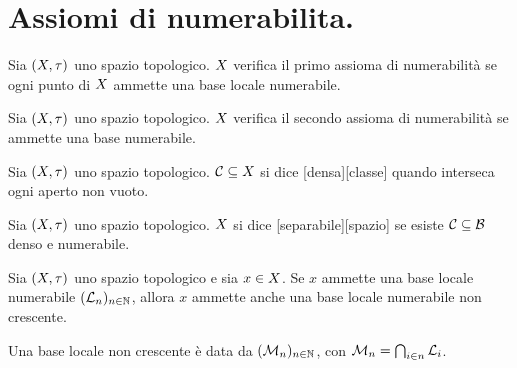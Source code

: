 \section{Assiomi di numerabilita.}\label{AssiomiDiNumerabilita}
\begin{Axiom}
	Sia $(X,\tau)$ uno spazio topologico.
	$X$ verifica il primo assioma di numerabilit\`a
	se ogni punto di $X$ ammette una base locale
	numerabile.
\end{Axiom}
\begin{Axiom}
	Sia $(X,\tau)$ uno spazio topologico.
	$X$ verifica il secondo assioma di numerabilit\`a
	se ammette una base numerabile.
\end{Axiom}
\begin{Definition}
	Sia $(X,\tau)$ uno spazio topologico.
	$\mathcal{C} \subseteq X$ si dice
	[densa][classe] quando interseca ogni aperto non
	vuoto.
\end{Definition}
\begin{Definition}
	Sia $(X,\tau)$ uno spazio topologico.
	$X$ si dice
	[separabile][spazio] se esiste
	$\mathcal{C} \subseteq \mathcal{B}$ denso e numerabile.
\end{Definition}
\begin{Theorem}
	Sia $(X,\tau)$ uno spazio topologico e sia $x \in X$. Se $x$ ammette una base locale numerabile $(\mathcal{L}_n)_{n \in \mathbb{N}}$, allora $x$ ammette anche una base locale numerabile non crescente.
\end{Theorem}
\Proof Una base locale non crescente \`e data da $(\mathcal{M}_n)_{n \in \mathbb{N}}$, con $\mathcal{M}_n = \bigcap_{i \in n} \mathcal{L}_i$. \EndProof
